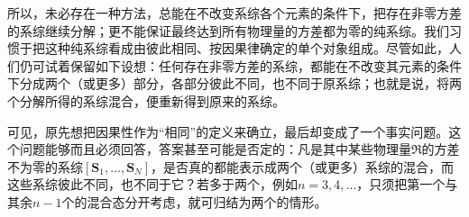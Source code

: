 \documentclass[fontsize=13pt,twoside,openany,headings=normal,parskip=false,bookmarkpackage=false,DIV=calc]{scrbook}
\begin{document}
所以，未必存在一种方法，总能在不改变系综各个元素的条件下，把存在非零方差的系综继续分解；更不能保证最终达到所有物理量的方差都为零的纯系综。我们习惯于把这种纯系综看成由彼此相同、按因果律确定的单个对象组成。尽管如此，人们仍可试着保留如下设想：任何存在非零方差的系综，都能在不改变其元素的条件下分成两个（或更多）部分，各部分彼此不同，也不同于原系综；也就是说，将两个分解所得的系综混合，便重新得到原来的系综。

可见，原先想把因果性作为“相同”的定义来确立，最后却变成了一个事实问题。这个问题能够而且必须回答，答案甚至可能是否定的：凡是其中某些物理量$\mathfrak R$的方差不为零的系综$[\boldsymbol{S}_1,\allowbreak \ldots,\allowbreak \boldsymbol{S}_N]$，是否真的都能表示成两个（或更多）系综的混合，而这些系综彼此不同，也不同于它？若多于两个，例如$n=3,\allowbreak 4,\allowbreak \ldots$，只须把第一个与其余$n-1$个的混合态分开考虑，就可归结为两个的情形。
\end{document}
